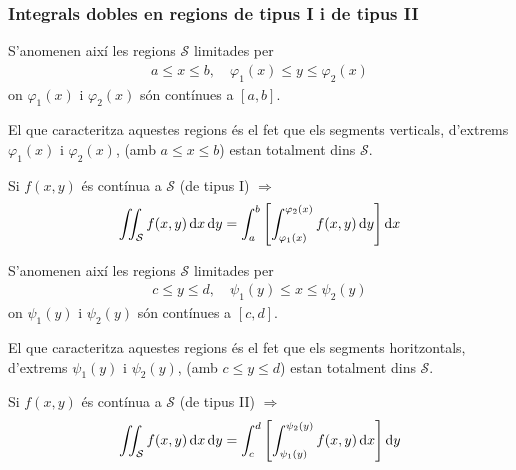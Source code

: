 \subsubsection*{Integrals dobles en regions de tipus I i de tipus II}
\begin{defi}
	S'anomenen així les regions $\mathcal{S}$ limitades per
	\begin{align*}
		a \leq x \leq b, \quad \varphi_{1} (x) \leq y \leq \varphi_{2}(x)
	\end{align*}
	on $\varphi_{1}(x)$ i $\varphi_{2}(x)$ són contínues a $[a,b]$.

	El que caracteritza aquestes regions és el fet que els segments verticals, d'extrems $\varphi_{1}(x)$ i $\varphi_{2}(x)$, (amb $a \leq x \leq b$) estan totalment dins $\mathcal{S}$.
\end{defi}
\begin{thm}
    Si $f(x,y)$ és contínua a $\mathcal{S}$ (de tipus I) $\displaystyle \Rightarrow$
    \begin{align*}
        \iint_{\mathcal{S}} f(x,y) \mathop{}\!\mathrm{d} x \mathop{}\!\mathrm{d} y = \int_{a}^{b} \left[ \int_{\varphi_{1}(x)}^{\varphi_{2}(x)} f(x,y) \mathop{}\!\mathrm{d} y \right] \mathop{}\!\mathrm{d} x
    \end{align*}
\end{thm}

\begin{defi}
	S'anomenen així les regions $\mathcal{S}$ limitades per
	\begin{align*}
		c \leq y \leq d, \quad \psi_{1} (y) \leq x \leq \psi_{2}(y)
	\end{align*}
	on $\psi_{1}(y)$ i $\psi_{2}(y)$ són contínues a $[c,d]$.

	El que caracteritza aquestes regions és el fet que els segments horitzontals, d'extrems $\psi_{1}(y)$ i $\psi_{2}(y)$, (amb $c \leq y \leq d$) estan totalment dins $\mathcal{S}$.
\end{defi}
\begin{thm}
	Si $f(x,y)$ és contínua a $\mathcal{S}$ (de tipus II) $\displaystyle \Rightarrow$
	\begin{align*}
        \iint_{\mathcal{S}} f(x,y) \mathop{}\!\mathrm{d} x \mathop{}\!\mathrm{d} y = \int_{c}^{d} \left[ \int_{\psi_{1}(y)}^{\psi_{2}(y)} f(x,y) \mathop{}\!\mathrm{d} x \right] \mathop{}\!\mathrm{d} y
    \end{align*}
\end{thm}

